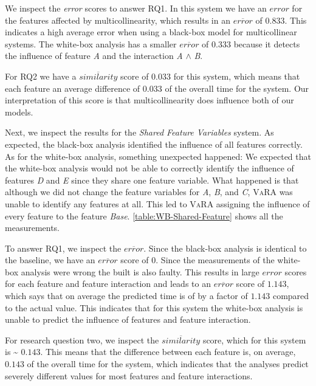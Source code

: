 We inspect the \emph{error} scores to answer RQ1. In this system we have an $error$ for the features affected by multicollinearity,
which results in an $\overline{error}$ of $0.833$. This indicates a high average error when using a black-box model for multicollinear systems.
The white-box analysis has a smaller $\overline{error}$ of $0.333$ because it detects the influence of feature \emph{A} and
the interaction \emph{A} $\land$ \emph{B}.

For RQ2 we have a $\overline{similarity}$ score of $0.033$ for this system,
which means that each feature an average difference of $0.033$ of the overall time for the system. 
Our interpretation of this score is that multicollinearity does influence both of our models. 

Next, we inspect the results for the \emph{Shared Feature Variables} system. 
As expected, the black-box analysis identified the influence of all features correctly. 
As for the white-box analysis, something unexpected happened: 
We expected that the white-box analysis would not be able to correctly identify the influence of features \emph{D} and \emph{E} since they share one
feature variable. What happened is that although we did not change the feature variables for \emph{A}, \emph{B}, and \emph{C}, \textsc{VaRA} 
was unable to identify any features at all. This led to \textsc{VaRA} assigning the influence of every feature to the feature \emph{Base}.
\autoref{table:WB-Shared-Feature} shows all the measurements.

To answer RQ1, we inspect the $\overline{error}$. Since the black-box analysis is identical to the baseline, we have an 
$\overline{error}$ score of $0$. Since the measurements of the white-box analysis were wrong the {\perfInfluenceModel} built
is also faulty. This results in large $error$ scores for each feature and feature interaction and leads to an $\overline{error}$ score
of $1.143$, which says that on average the predicted time is of by a factor of $1.143$ compared to the actual value.
This indicates that for this system the white-box analysis is unable to predict the influence of features and feature interaction.

For research question two, we inspect the $\overline{similarity}$ score, which for this system is \textasciitilde{} $0.143$.
This means that the difference between each feature is, on average, $0.143$ of the overall time for the system,
which indicates that the analyses predict severely different values for most features and feature interactions.

